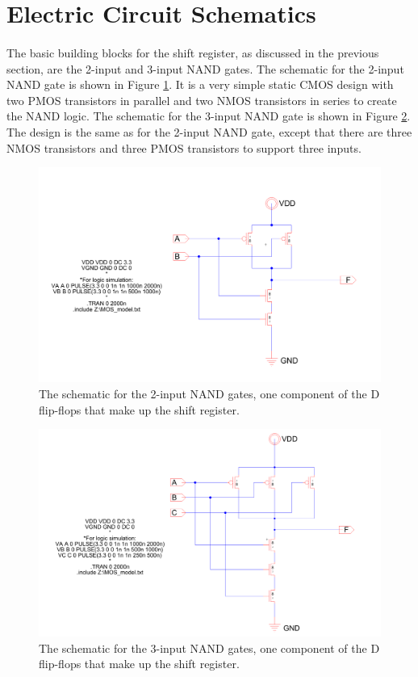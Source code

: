 \documentclass{article}
\begin{document}
\section{Electric Circuit Schematics}
  \paragraph{}
  The basic building blocks for the shift register, as discussed in the previous section, are the 2-input and 3-input NAND gates. The schematic for the 2-input NAND gate is shown in Figure \ref{fig:2-in-nand-schem}. It is a very simple static CMOS design with two PMOS transistors in parallel and two NMOS transistors in series to create the NAND logic. The schematic for the 3-input NAND gate is shown in Figure \ref{fig:3-in-nand-schem}. The design is the same as for the 2-input NAND gate, except that there are three NMOS transistors and three PMOS transistors to support three inputs.

  \begin{figure}[H]
    \centering
    \includegraphics[width=0.8\linewidth, frame]{screenshots/2-input-nand-schem.png}
    \caption{The schematic for the 2-input NAND gates, one component of the D flip-flops that make up the shift register.}
    \label{fig:2-in-nand-schem}
  \end{figure}

  \begin{figure}[H]
    \centering
    \includegraphics[width=0.8\linewidth, frame]{screenshots/3-input-nand-schem.png}
    \caption{The schematic for the 3-input NAND gates, one component of the D flip-flops that make up the shift register.}
    \label{fig:3-in-nand-schem}
  \end{figure}
\end{document}
